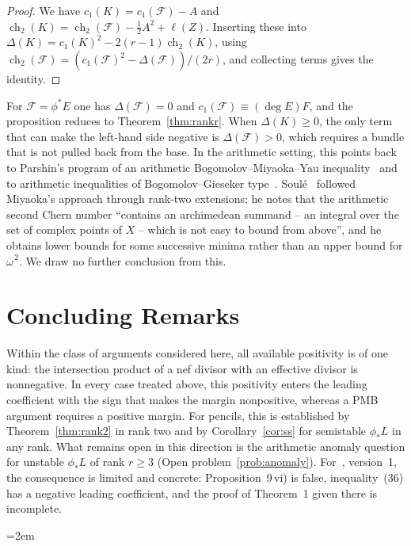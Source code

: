 \documentclass[11pt]{article}
\theoremstyle{definition}
\theoremstyle{remark}
\DeclareMathOperator{\ch}{ch}
\newcommand{\cF}{\mathcal{F}}
\newcommand{\ob}{\overline{\omega}}
\begin{document}
\begin{proof}
We have $c_1(K)=c_1(\cF)-A$ and $\ch_2(K)=\ch_2(\cF)-\frac12A^2+\ell(Z)$.
Inserting these into $\Delta(K)=c_1(K)^2-2(r-1)\ch_2(K)$, using
$\ch_2(\cF)=(c_1(\cF)^2-\Delta(\cF))/(2r)$, and collecting terms gives the
identity.
\end{proof}

For $\cF=\phi^*E$ one has $\Delta(\cF)=0$ and $c_1(\cF)\equiv(\deg E)F$, and the
proposition reduces to Theorem~\ref{thm:rankr}. When $\Delta(K)\ge 0$, the only
term that can make the left-hand side negative is $\Delta(\cF)>0$, which requires
a bundle that is not pulled back from the base. In the arithmetic setting, this
points back to Parshin's program of an arithmetic Bogomolov--Miyaoka--Yau
inequality~\cite{Pa88,MB90} and to arithmetic inequalities of Bogomolov--Gieseker
type~\cite{Mo94}. Soul\'e~\cite{So05} followed Miyaoka's approach through rank-two
extensions; he notes that the arithmetic second Chern number ``contains an
archimedean summand -- an integral over the set of complex points of $X$ -- which
is not easy to bound from above'', and he obtains lower bounds for some successive
minima rather than an upper bound for $\ob^{\,2}$. We draw no further conclusion
from this.

\section{Concluding Remarks}\label{sec:conclusion}

Within the class of arguments considered here, all available positivity is of one
kind: the intersection product of a nef divisor with an effective divisor is
nonnegative. In every case treated above, this positivity enters the leading
coefficient with the sign that makes the margin nonpositive, whereas a PMB
argument requires a positive margin. For pencils, this is established by
Theorem~\ref{thm:rank2} in rank two and by Corollary~\ref{cor:ss} for semistable
$\phi_*L$ in any rank. What remains open in this direction is the arithmetic
anomaly question for unstable $\phi_*L$ of rank $r\ge 3$ (Open
problem~\ref{prob:anomaly}). For~\cite{So26}, version~1, the consequence is
limited and concrete: Proposition~9\,vi) is false, inequality~(36) has a
negative leading coefficient, and the proof of Theorem~1 given there is
incomplete.

{}
\begingroup
\sloppy\emergencystretch=2em

\endgroup
\end{document}

